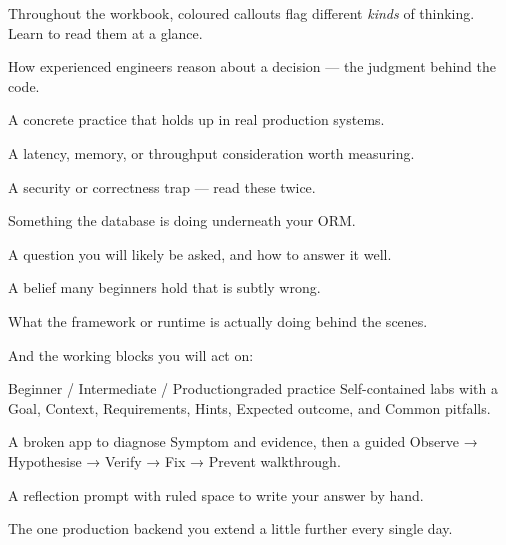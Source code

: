 
Throughout the workbook, coloured callouts flag different \emph{kinds} of thinking. Learn to read them at a glance.

\begin{seniornote}How experienced engineers reason about a decision — the judgment behind the code.\end{seniornote}
\begin{prodtip}A concrete practice that holds up in real production systems.\end{prodtip}
\begin{perfnote}A latency, memory, or throughput consideration worth measuring.\end{perfnote}
\begin{secwarn}A security or correctness trap — read these twice.\end{secwarn}
\begin{dbinsight}Something the database is doing underneath your ORM.\end{dbinsight}
\begin{interview}A question you will likely be asked, and how to answer it well.\end{interview}
\begin{misconception}A belief many beginners hold that is subtly wrong.\end{misconception}
\begin{behind}What the framework or runtime is actually doing behind the scenes.\end{behind}

\smallskip
And the working blocks you will act on:

\begin{minilab}{Beginner / Intermediate / Production}{graded practice}
Self-contained labs with a Goal, Context, Requirements, Hints, Expected outcome, and Common pitfalls.
\end{minilab}
\begin{debuglab}{A broken app to diagnose}
Symptom and evidence, then a guided Observe → Hypothesise → Verify → Fix → Prevent walkthrough.
\end{debuglab}
\begin{thinkbox}
A reflection prompt with ruled space to write your answer by hand.
\end{thinkbox}
\begin{buildalong}[ShopFlow]
The one production backend you extend a little further every single day.
\end{buildalong}

